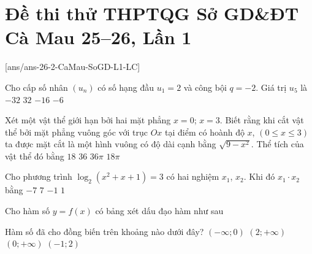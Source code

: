 \section*{Đề thi thử THPTQG Sở GD\&ĐT Cà Mau 25--26, Lần 1}

\caulc
{}[ans/ans-26-2-CaMau-SoGD-L1-LC]
\begin{ex}%
	Cho cấp số nhân $(u_n)$ có số hạng đầu $u_1=2$ và công bội $ q=-2$. Giá trị $u_5$ là
	\choice
	{ $-32$}
	{\True $32$}
	{ $-16$}
	{ $-6$}
\end{ex}
\begin{ex}%
	Xét một vật thể giới hạn bởi hai mặt phẳng $ x=0$; $x=3$. Biết rằng khi cắt vật thể bởi mặt phẳng vuông góc với trục $Ox$ tại điểm có hoành độ $x$, $\left(0\le x\le 3\right)$ ta được mặt cắt là một hình vuông có độ dài cạnh bằng $\sqrt{9-x^2}$. Thể tích của vật thể đó bằng
	\choice
	{\True $18$}
	{ $36$}
	{ $36\pi $}
	{ $18\pi $}
\end{ex}
\begin{ex}%
	Cho phương trình $\log_2(x^2+x+1)=3$ có hai nghiệm $x_1$, $x_2$. Khi đó $x_1\cdot x_2$ bằng
	\choice
	{\True $-7$}
	{ $7$}
	{ $-1$}
	{ $1$}
\end{ex}
\begin{ex}%
	Cho hàm số $ y=f(x)$ có bảng xét dấu đạo hàm như sau
	\begin{center}
	\end{center}
	Hàm số đã cho đồng biến trên khoảng nào dưới đây?
	\choice
	{ $(-\infty;0)$}
	{\True $(2;+\infty)$}
	{ $(0;+\infty)$}
	{ $(-1;2)$}
\end{ex}
